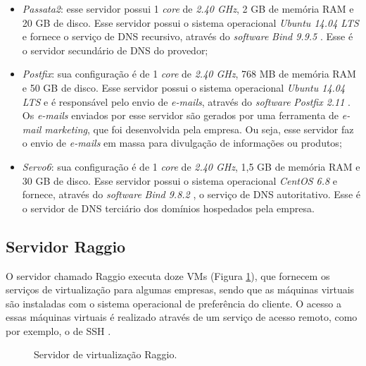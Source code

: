 \begin{itemize}
 \item \textit{Passata2}: esse servidor possui 1 \textit{core} de \textit{2.40 GHz}, 2 GB de memória \ac{RAM} e 20 GB de disco. 
 Esse servidor possui o sistema operacional \textit{Ubuntu 14.04 \ac{LTS}} \cite{ubuntu} e fornece o serviço de \ac{DNS} recursivo, através do 
 \textit{software} \textit{Bind 9.9.5} \cite{bind}. Esse é o servidor secundário de \ac{DNS} do provedor;
 
 \item \textit{Postfix}: sua configuração é de 1 \textit{core} de \textit{2.40 GHz}, 768 MB de memória \ac{RAM} e 50 GB de disco. 
 Esse servidor possui o sistema operacional \textit{Ubuntu 14.04 \ac{LTS}} \cite{ubuntu} e é responsável pelo envio de \textit{e-mails}, 
 através do \textit{software} \textit{Postfix 2.11} \cite{postfix}. Os \textit{e-mails} enviados por esse servidor são gerados por uma 
 ferramenta de \textit{e-mail marketing}, que foi desenvolvida pela empresa. Ou seja, esse servidor faz o envio de \textit{e-mails} em massa 
 para divulgação de informações ou produtos;
 
 \item \textit{Servo6}: sua configuração é de 1 \textit{core} de \textit{2.40 GHz}, 1,5 GB de memória \ac{RAM} e 30 GB de disco. 
 Esse servidor possui o sistema operacional \textit{CentOS 6.8} e fornece, através do \textit{software} \textit{Bind 9.8.2} \cite{bind}, o 
 serviço de \ac{DNS} autoritativo. Esse é o servidor de \ac{DNS} terciário dos domínios hospedados pela empresa.
\end{itemize}

\subsection{Servidor Raggio}
\label{section:serv_raggio}

O servidor chamado Raggio executa doze \ac{VM}s (Figura \ref{fig:servidor_raggio}), que fornecem os serviços de virtualização para algumas empresas,
sendo que as máquinas virtuais são instaladas com o sistema operacional de preferência do cliente. O acesso a essas máquinas virtuais é realizado
através de um serviço de acesso remoto, como por exemplo, o de \ac{SSH} \cite{barrett2005}.

\begin{figure}[h!]
 \centering
 \caption{Servidor de virtualização Raggio.}
 \label{fig:servidor_raggio}
\end{figure}


